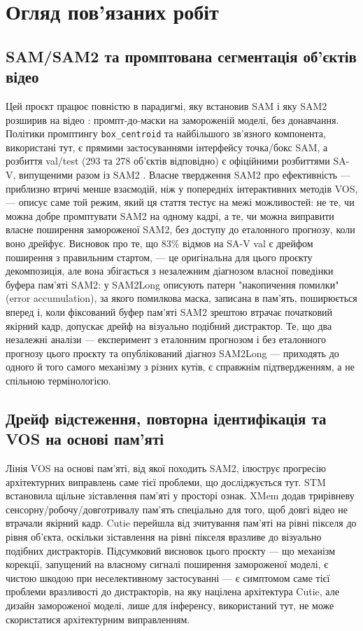 \documentclass[11pt]{article}
\begin{document}
\section{Огляд пов'язаних робіт}

\subsection{SAM/SAM2 та промптована сегментація об'єктів відео}

Цей проєкт працює повністю в парадигмі, яку встановив SAM \citep{kirillov2023} і яку SAM2 розширив на відео \citep{ravi2024}: промпт-до-маски на замороженій моделі, без донавчання. Політики промптингу \texttt{box\_centroid} та найбільшого зв'язного компонента, використані тут, є прямими застосуваннями інтерфейсу точка/бокс SAM, а розбиття val/test (293 та 278 об'єктів відповідно) є офіційними розбиттями SA-V, випущеними разом із SAM2 \citep{metaai2024}. Власне твердження SAM2 про ефективність --- приблизно втричі менше взаємодій, ніж у попередніх інтерактивних методів VOS, --- описує саме той режим, який ця стаття тестує на межі можливостей: не те, чи можна добре промптувати SAM2 на одному кадрі, а те, чи можна виправити власне поширення замороженої SAM2, без доступу до еталонного прогнозу, коли воно дрейфує. Висновок про те, що 83\% відмов на SA-V val є дрейфом поширення з правильним стартом, --- це оригінальна для цього проєкту декомпозиція, але вона збігається з незалежним діагнозом власної поведінки буфера пам'яті SAM2: \citet{ding2024} у SAM2Long описують патерн "накопичення помилки" (error accumulation), за якого помилкова маска, записана в пам'ять, поширюється вперед і, коли фіксований буфер пам'яті SAM2 зрештою втрачає початковий якірний кадр, допускає дрейф на візуально подібний дистрактор. Те, що два незалежні аналізи --- експеримент з еталонним прогнозом і без еталонного прогнозу цього проєкту та опублікований діагноз SAM2Long --- приходять до одного й того самого механізму з різних кутів, є справжнім підтвердженням, а не спільною термінологією.

\subsection{Дрейф відстеження, повторна ідентифікація та VOS на основі пам'яті}

Лінія VOS на основі пам'яті, від якої походить SAM2, ілюструє прогресію архітектурних виправлень саме тієї проблеми, що досліджується тут. STM \citep{oh2019} встановила щільне зіставлення пам'яті у просторі ознак. XMem \citep{cheng2022xmem} додав трирівневу сенсорну/робочу/довготривалу пам'ять спеціально для того, щоб довгі відео не втрачали якірний кадр. Cutie \citep{cheng2023cutie} перейшла від зчитування пам'яті на рівні пікселя до рівня об'єкта, оскільки зіставлення на рівні пікселя вразливе до візуально подібних дистракторів. Підсумковий висновок цього проєкту --- що механізм корекції, запущений на власному сигналі поширення замороженої моделі, є чистою шкодою при неселективному застосуванні --- є симптомом саме тієї проблеми вразливості до дистракторів, на яку націлена архітектура Cutie, але дизайн замороженої моделі, лише для інференсу, використаний тут, не може скористатися архітектурним виправленням.
\end{document}
